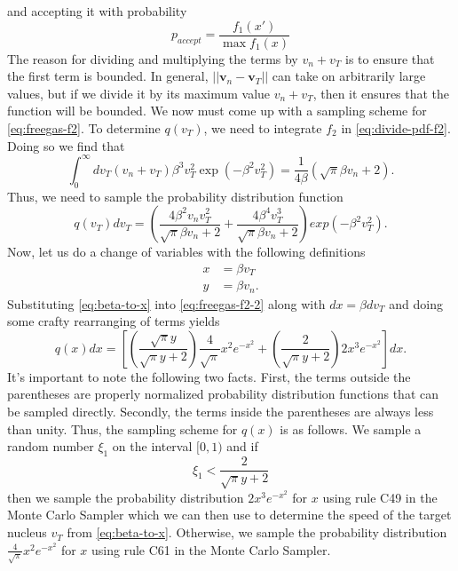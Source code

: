 and accepting it with probability
\begin{equation}
  \label{eq:freegas-accept}
  p_{accept} = \frac{f_1(x')}{\max f_1(x)}
\end{equation}
The reason for dividing and multiplying the terms by $v_n + v_T$ is to ensure
that the first term is bounded. In general, $|| \mathbf{v}_n - \mathbf{v}_T ||$
can take on arbitrarily large values, but if we divide it by its maximum value
$v_n + v_T$, then it ensures that the function will be bounded. We now must come
up with a sampling scheme for \eqref{eq:freegas-f2}. To determine $q(v_T)$, we
need to integrate $f_2$ in \eqref{eq:divide-pdf-f2}. Doing so we find that
\begin{equation}
  \label{eq:integrate-f2}
  \int_0^{\infty} dv_T (v_n + v_T) \beta^3 v_T^2 \exp \left ( -\beta^2 v_T^2
  \right ) = \frac{1}{4\beta} \left ( \sqrt{\pi} \beta v_n + 2 \right ).
\end{equation}
Thus, we need to sample the probability distribution function
\begin{equation}
  \label{eq:freegas-f2-2}
  q(v_T) dv_T = \left ( \frac{4\beta^2 v_n v_T^2}{\sqrt{\pi} \beta v_n + 2} +
  \frac{4\beta^4 v_T^3}{\sqrt{\pi} \beta v_n + 2} \right ) exp \left (
  -\beta^2 v_T^2 \right ).
\end{equation}
Now, let us do a change of variables with the following definitions
\begin{equation}
  \label{eq:beta-to-x}
  \begin{split}
    x &= \beta v_T \\
    y &= \beta v_n.
  \end{split}
\end{equation}
Substituting \eqref{eq:beta-to-x} into \eqref{eq:freegas-f2-2} along with $dx =
\beta dv_T$ and doing some crafty rearranging of terms yields
\begin{equation}
  \label{eq:freegas-f2-3}
  q(x) dx = \left [ \left ( \frac{\sqrt{\pi} y}{\sqrt{\pi} y + 2} \right )
    \frac{4}{\sqrt{\pi}} x^2 e^{-x^2} + \left ( \frac{2}{\sqrt{\pi} y + 2}
    \right ) 2x^3 e^{-x^2} \right ] dx.
\end{equation}
It's important to note the following two facts. First, the terms outside the
parentheses are properly normalized probability distribution functions that can
be sampled directly. Secondly, the terms inside the parentheses are always less
than unity. Thus, the sampling scheme for $q(x)$ is as follows. We sample a
random number $\xi_1$ on the interval $[0,1)$ and if
\begin{equation}
  \label{eq:freegas-alpha}
  \xi_1 < \frac{2}{\sqrt{\pi} y + 2}
\end{equation}
then we sample the probability distribution $2x^3 e^{-x^2}$ for $x$ using rule
C49 in the Monte Carlo Sampler \cite{lanl-everett-1983} which we can then use to
determine the speed of the target nucleus $v_T$ from
\eqref{eq:beta-to-x}. Otherwise, we sample the probability distribution
$\frac{4}{\sqrt{\pi}} x^2 e^{-x^2}$ for $x$ using rule C61 in the Monte Carlo
Sampler.

